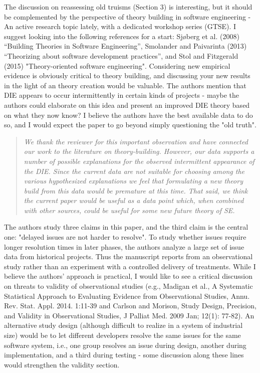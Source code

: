 The discussion on reassessing old truisms (Section 3) is
interesting, but it should be complemented by the
perspective of theory building in software engineering - An
active research topic lately, with a dedicated workshop
series (GTSE). I suggest looking into the following
references for a start: Sj{\o}berg et al. (2008) ``Building
Theories in Software Engineering'', Smolander and Paivarinta
(2013) ``Theorizing about software development practices'',
and Stol and Fitzgerald (2015) "Theory-oriented software
engineering". Considering new empirical evidence is
obviously critical to theory building, and discussing your
new results in the light of an theory creation would be
valuable. The authors mention that DIE appears to occur
intermittently in certain kinds of projects - maybe the
authors could elaborate on this idea and present an improved
DIE theory based on what they now know? I believe the
authors have the best available data to do so, and I would
expect the paper to go beyond simply questioning the "old
truth". 
 
 \begin{quote}{\em 
We thank the reviewer for this important observation and have connected our work to the literature on theory-building. However, our data supports a number of possible explanations for the observed intermittent appearance of the DIE. Since the current data are not suitable for choosing among the various hypothesized explanations we feel that formulating a new theory build from this data
would be premature at this time. That said, we think the current paper would be useful
as a data point which, when combined with other sources, could be useful for some new future theory of SE.
}\end{quote}

The authors study three claims in this paper, and the
third claim is the central one: "delayed issues are not
harder to resolve". To study whether issues require longer
resolution times in later phases, the authors analyze a
large set of issue data from historical projects. Thus the
manuscript reports from an observational study rather than
an experiment with a controlled delivery of treatments.
While I believe the authors' approach is practical, I would
like to see a critical discussion on threats to validity of
observational studies (e.g., Madigan et al., A Systematic
Statistical Approach to Evaluating Evidence from
Observational Studies, Annu. Rev. Stat. Appl. 2014. 1:11-39
and Carlson and Morison, Study Design, Precision, and
Validity in Observational Studies, J Palliat Med. 2009 Jan;
12(1): 77-82). An alternative study design (although
difficult to realize in a system of industrial size) would
be to let different developers resolve the same issues for
the same software system, i.e., one group resolves an issue
during design, another during implementation, and a third
during testing - some discussion along these lines would
strengthen the validity section. 

